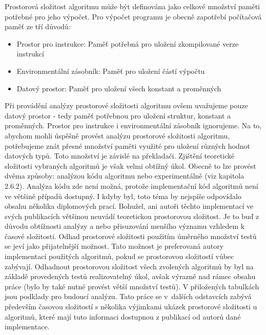 \documentclass[12pt]{article}
\begin{document}
Prostorová složitost algoritmu může být definována jako celkové množství paměti potřebné pro jeho výpočet. Pro výpočet programu je obecně zapotřebí počítačová paměť ze tří důvodů:
\begin{itemize}
\item Prostor pro instrukce: Paměť potřebná pro uložení zkompilované verze instrukcí
\item Environmentální zásobník: Paměť pro uložení částí výpočtu
\item Datový prostor: Paměť pro uložení všech konstant a proměnných
\end{itemize}
Při provádění analýzy prostorové složitosti algoritmu ovšem uvažujeme pouze datový prostor - tedy paměť potřebnou pro uložení struktur, konstant a proměnných. Prostor pro instrukce i environmentální zásobník ignorujeme. Na to, abychom mohli úspěšně provést analýzu prostorové složitosti algoritmu, potřebujeme znát přesné množství paměti využité pro uložení různých hodnot datových typů. Toto množství je závislé na překladači. 
\newline
\indent
Zjištění teoretické složitosti vybraných algoritmů je však velmi obtížný úkol. Obecně to lze provést dvěma způsoby: analýzou kódu algoritmu nebo experimentálně (viz kapitola 2.6.2). 
\newline
\indent
Analýza kódu zde není možná, protože implementační kód algoritmů není ve většině případů dostupný. I kdyby byl, toto téma by nejspíše odpovídalo obsahu několika diplomových prací. Bohužel, ani autoři těchto implementací ve svých publikacích většinou neuvádí teoretickou prostorovou složitost. Je to buď z důvodu obtížnosti analýzy a nebo přisuzování menšího významu vzhledem k časové složitosti.
\newline
\indent
Odhad prostorové složitosti použitím úměrného množství testů se jeví jako přijatelnější možnost. Tato možnost je preferovaná autory implementací použitých algoritmů, pokud se prostorovou složitostí vůbec zabývají. Odhadnout prostorovou složitost všech zvolených algoritmů by byl na základě provedených testů realizovatelný úkol, avšak výrazně nad rámec obsahu práce (bylo by také nutné provést větší množství testů). V přiložených tabulkách jsou podklady pro budoucí analýzu. Tato práce se v~dalších odstavcích zabývá především časovou složitostí s několika výjimkami ukázek prostorové složitosti u algoritmů, které mají tuto informaci dostupnou z publikací od autorů dané implementace. 
\newline
\newline
\end{document}
